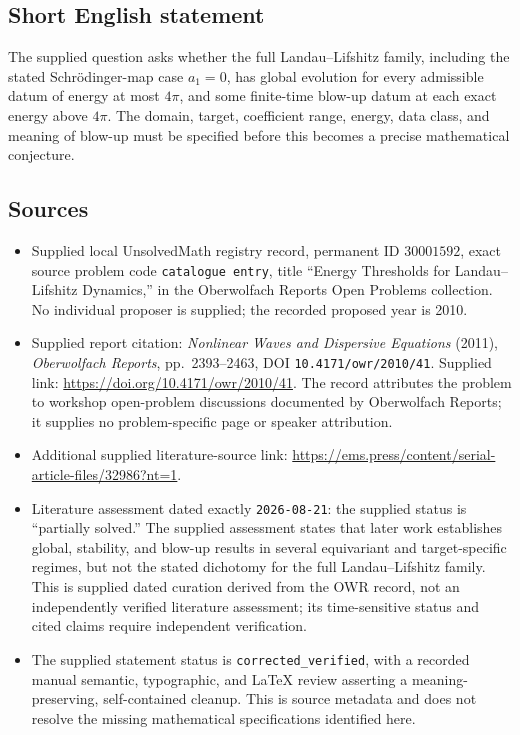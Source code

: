 \documentclass[11pt]{article}
\begin{document}
\subsection{Short English statement}
The supplied question asks whether the full Landau--Lifshitz family, including the stated Schr\"odinger-map case \(a_1=0\), has global evolution for every admissible datum of energy at most \(4\pi\), and some finite-time blow-up datum at each exact energy above \(4\pi\). The domain, target, coefficient range, energy, data class, and meaning of blow-up must be specified before this becomes a precise mathematical conjecture.
\subsection{Sources}
\begin{itemize}
\item Supplied local UnsolvedMath registry record, permanent ID \(30001592\), exact source problem code \texttt{catalogue entry}, title ``Energy Thresholds for Landau--Lifshitz Dynamics,'' in the Oberwolfach Reports Open Problems collection. No individual proposer is supplied; the recorded proposed year is 2010.
\item Supplied report citation: \emph{Nonlinear Waves and Dispersive Equations} (2011), \emph{Oberwolfach Reports}, pp.\ 2393--2463, DOI \texttt{10.4171/owr/2010/41}. Supplied link: \url{https://doi.org/10.4171/owr/2010/41}. The record attributes the problem to workshop open-problem discussions documented by Oberwolfach Reports; it supplies no problem-specific page or speaker attribution.
\item Additional supplied literature-source link: \url{https://ems.press/content/serial-article-files/32986?nt=1}.
\item Literature assessment dated exactly \texttt{2026-08-21}: the supplied status is ``partially solved.'' The supplied assessment states that later work establishes global, stability, and blow-up results in several equivariant and target-specific regimes, but not the stated dichotomy for the full Landau--Lifshitz family. This is supplied dated curation derived from the OWR record, not an independently verified literature assessment; its time-sensitive status and cited claims require independent verification.
\item The supplied statement status is \texttt{corrected\_verified}, with a recorded manual semantic, typographic, and LaTeX review asserting a meaning-preserving, self-contained cleanup. This is source metadata and does not resolve the missing mathematical specifications identified here.
\end{itemize}
\end{document}
